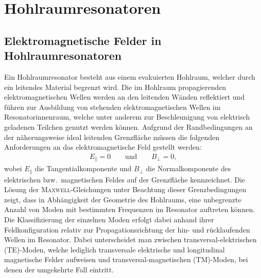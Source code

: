 \chapter{Hohlraumresonatoren}
\label{sec:hohlraumresonatoren}


\section{Elektromagnetische Felder in Hohlraumresonatoren}
Ein Hohlraumresonator besteht aus einem evakuierten Hohlraum, welcher durch ein leitendes Material begrenzt wird.
Die im Hohlraum propagierenden elektromagnetischen Wellen werden an den leitenden Wänden reflektiert und führen zur Ausbildung von stehenden elektromagnetischen Wellen im Resonatorinnenraum, welche unter anderem zur Beschleunigung von elektrisch geladenen Teilchen genutzt werden können.
Aufgrund der Randbedingungen an der näherungsweise ideal leitenden Grenzfläche müssen die folgenden Anforderungen an das elektromagnetische Feld gestellt werden:
\begin{align}
  E_\parallel = 0 \qquad \text{und} \qquad B_\perp = 0\text{,}
  \label{eq:randbedingung_leiter}
\end{align}
wobei $E_\parallel$ die Tangentialkomponente und $B_\perp$ die Normalkomponente des elektrischen bzw.\ magnetischen Feldes auf der Grenzfläche kennzeichnet.
Die Lösung der \textsc{Maxwell}-Gleichungen unter Beachtung dieser Grenzbedingungen zeigt, dass in Abhängigkeit der Geometrie des Hohlraums, eine unbegrenzte Anzahl von Moden mit bestimmten Frequenzen im Resonator auftreten können.
Die Klassifizierung der einzelnen Moden erfolgt dabei anhand ihrer Feldkonfiguration relativ zur Propagationsrichtung der hin- und rücklaufenden Wellen im Resonator.
Dabei unterscheidet man zwischen transversal-elektrischen (TE)-Moden, welche lediglich transversale elektrische und longitudinal magnetische Felder aufweisen und transversal-magnetischen (TM)-Moden, bei denen der umgekehrte Fall eintritt.

